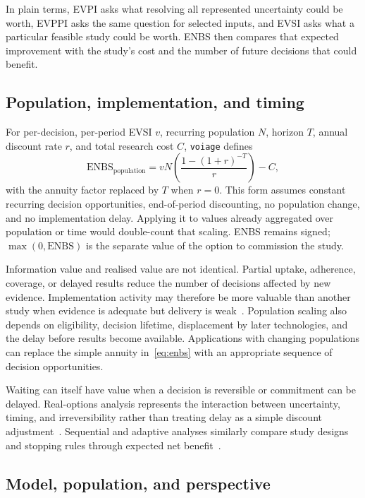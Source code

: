 In plain terms, EVPI asks what resolving all represented uncertainty could be
worth, EVPPI asks the same question for selected inputs, and EVSI asks what a
particular feasible study could be worth. ENBS then compares that expected
improvement with the study's cost and the number of future decisions that
could benefit.

\subsection{Population, implementation, and timing}

For per-decision, per-period EVSI $v$, recurring population $N$, horizon $T$,
annual discount rate $r$, and total research cost $C$, \texttt{voiage} defines
\begin{equation}\label{eq:enbs}
  \mathrm{ENBS}_{\mathrm{population}} =
  vN\left(\frac{1-{(1+r)}^{-T}}{r}\right)-C,
\end{equation}
with the annuity factor replaced by $T$ when $r=0$. This form assumes constant
recurring decision opportunities, end-of-period discounting, no population
change, and no implementation delay. Applying it to values already aggregated
over population or time would double-count that scaling. ENBS remains signed;
$\max(0,\mathrm{ENBS})$ is the separate value of the option to commission the
study.

Information value and realised value are not identical. Partial uptake,
adherence, coverage, or delayed results reduce the number of decisions affected
by new evidence. Implementation activity may therefore be more valuable than
another study when evidence is adequate but delivery is
weak~\cite{fenwick2008implementation}. Population scaling also depends on
eligibility, decision lifetime, displacement by later technologies, and the
delay before results become available. Applications with changing populations
can replace the simple annuity in~\eqref{eq:enbs} with an appropriate sequence
of decision opportunities.

Waiting can itself have value when a decision is reversible or commitment can
be delayed. Real-options analysis represents the interaction between
uncertainty, timing, and irreversibility rather than treating delay as a simple
discount adjustment~\cite{palmer2000options}. Sequential and adaptive analyses
similarly compare study designs and stopping rules through expected net
benefit~\cite{flight2022sequential}.

\subsection{Model, population, and perspective}

